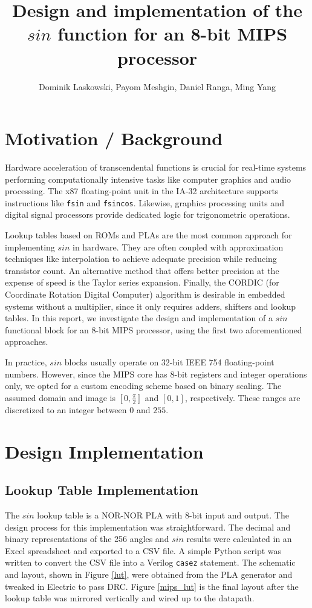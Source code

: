 \documentclass[10pt,journal]{IEEEtran}
\title{Design and implementation of the $sin$ function for an 8-bit MIPS processor}
\author{Dominik Laskowski, Payom Meshgin, Daniel Ranga, Ming Yang}
\begin{document}
\maketitle

\section{Motivation / Background}
Hardware acceleration of transcendental functions is crucial for real-time systems
performing computationally intensive tasks like computer graphics and audio processing.
The x87 floating-point unit in the IA-32 architecture supports instructions like \texttt{fsin}
and \texttt{fsincos}. Likewise, graphics processing units and digital signal processors
provide dedicated logic for trigonometric operations.

Lookup tables based on ROMs and PLAs are the most common approach for implementing $sin$
in hardware. They are often coupled with approximation techniques like interpolation to
achieve adequate precision while reducing transistor count. An alternative method that
offers better precision at the expense of speed is the Taylor series expansion. Finally,
the CORDIC (for Coordinate Rotation Digital Computer) algorithm is desirable in embedded
systems without a multiplier, since it only requires adders, shifters and lookup tables.
In this report, we investigate the design and implementation of a $sin$ functional block for
an 8-bit MIPS processor, using the first two aforementioned approaches.

In practice, $sin$ blocks usually operate on 32-bit IEEE 754 floating-point numbers. However,
since the MIPS core has 8-bit registers and integer operations only, we opted for a custom encoding
scheme based on binary scaling. The assumed domain and image is $[0, \frac{\pi}{2}]$ and $[0, 1]$,
respectively. These ranges are discretized to an integer between $0$ and $255$.

\section{Design Implementation}
\subsection{Lookup Table Implementation}
The $sin$ lookup table is a NOR-NOR PLA with 8-bit input and output. The design process for this
implementation was straightforward. The decimal and binary representations of the 256 angles and
$sin$ results were calculated in an Excel spreadsheet and exported to a CSV file. A simple Python
script was written to convert the CSV file into a Verilog \texttt{casez} statement. The schematic
and layout, shown in Figure \ref{lut}, were obtained from the PLA generator and tweaked in Electric
to pass DRC. Figure \ref{mips_lut} is the final layout after the lookup table was mirrored vertically
and wired up to the datapath.
\end{document}
